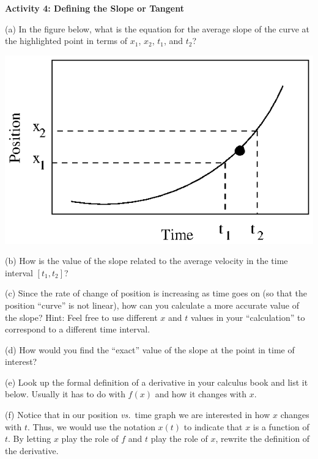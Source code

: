 \textbf{Activity 4: Defining the Slope or Tangent} 

(a) In the figure below, what is the equation for the average slope of the curve
at the highlighted point in terms of \( x_{1} \), \( x_{2} \), \( t_{1} \),
and \( t_{2} \)?

\vspace{0.3cm}
{\par\raggedright \includegraphics{equations/equations_fig2.eps} \par}
\vspace{0.3cm}

(b) How is the value of the slope related to the average velocity in the time
interval 
$[t_1,t_2]$?
\vspace{10mm}

(c) Since the rate of change of position is increasing as time goes on (so that
the position ``curve'' is not linear), how can you calculate
a more accurate value of the slope? Hint: Feel free to use different $x$ and 
$t$
values in your ``calculation'' to correspond to a different
time interval.
\vspace{20mm}

(d) How would you find the ``exact'' value of the slope at the
point in time of interest?
\vspace{20mm}

(e) Look up the formal definition of a derivative in your calculus book and
list it below. Usually it has to do with $f(x)$ and how it changes with $x$.
\vspace{20mm}

(f) Notice that in our position \textit{vs.}~time graph we are interested in how $x$ 
changes
with $t$. Thus, we would use the notation $x(t)$ to indicate that 
$x$ is a function
of $t$. By letting $x$ play the role of $f$ and $t$ play the role of 
$x$, rewrite the
definition of the derivative.
\vspace{20mm}

